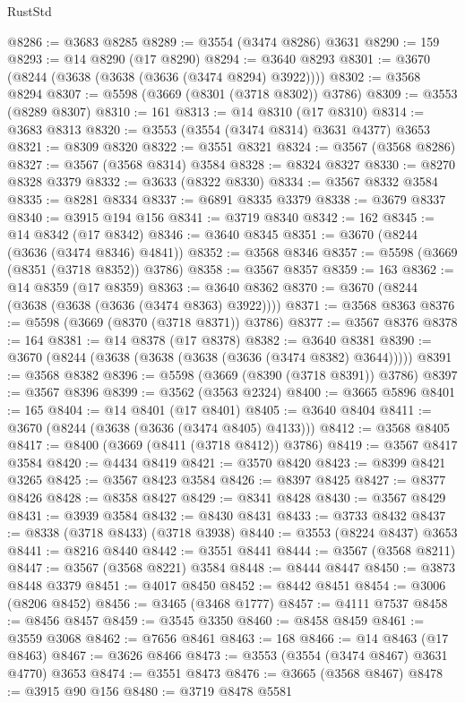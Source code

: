 \begin{lexlean}{RustStd}
\begin{coremodule}
@8286 := @3683 @8285
@8289 := @3554 (@3474 @8286) @3631
@8290 := 159
@8293 := @14 @8290 (@17 @8290)
@8294 := @3640 @8293
@8301 := @3670 (@8244 (@3638 (@3638 (@3636 (@3474 @8294) @3922))))
@8302 := @3568 @8294
@8307 := @5598 (@3669 (@8301 (@3718 @8302)) @3786)
@8309 := @3553 (@8289 @8307)
@8310 := 161
@8313 := @14 @8310 (@17 @8310)
@8314 := @3683 @8313
@8320 := @3553 (@3554 (@3474 @8314) @3631 @4377) @3653
@8321 := @8309 @8320
@8322 := @3551 @8321
@8324 := @3567 (@3568 @8286)
@8327 := @3567 (@3568 @8314) @3584
@8328 := @8324 @8327
@8330 := @8270 @8328 @3379
@8332 := @3633 (@8322 @8330)
@8334 := @3567 @8332 @3584
@8335 := @8281 @8334
@8337 := @6891 @8335 @3379
@8338 := @3679 @8337
@8340 := @3915 @194 @156
@8341 := @3719 @8340
@8342 := 162
@8345 := @14 @8342 (@17 @8342)
@8346 := @3640 @8345
@8351 := @3670 (@8244 (@3636 (@3474 @8346) @4841))
@8352 := @3568 @8346
@8357 := @5598 (@3669 (@8351 (@3718 @8352)) @3786)
@8358 := @3567 @8357
@8359 := 163
@8362 := @14 @8359 (@17 @8359)
@8363 := @3640 @8362
@8370 := @3670 (@8244 (@3638 (@3638 (@3636 (@3474 @8363) @3922))))
@8371 := @3568 @8363
@8376 := @5598 (@3669 (@8370 (@3718 @8371)) @3786)
@8377 := @3567 @8376
@8378 := 164
@8381 := @14 @8378 (@17 @8378)
@8382 := @3640 @8381
@8390 := @3670 (@8244 (@3638 (@3638 (@3638 (@3636 (@3474 @8382) @3644)))))
@8391 := @3568 @8382
@8396 := @5598 (@3669 (@8390 (@3718 @8391)) @3786)
@8397 := @3567 @8396
@8399 := @3562 (@3563 @2324)
@8400 := @3665 @5896
@8401 := 165
@8404 := @14 @8401 (@17 @8401)
@8405 := @3640 @8404
@8411 := @3670 (@8244 (@3638 (@3636 (@3474 @8405) @4133)))
@8412 := @3568 @8405
@8417 := @8400 (@3669 (@8411 (@3718 @8412)) @3786)
@8419 := @3567 @8417 @3584
@8420 := @4434 @8419
@8421 := @3570 @8420
@8423 := @8399 @8421 @3265
@8425 := @3567 @8423 @3584
@8426 := @8397 @8425
@8427 := @8377 @8426
@8428 := @8358 @8427
@8429 := @8341 @8428
@8430 := @3567 @8429
@8431 := @3939 @3584
@8432 := @8430 @8431
@8433 := @3733 @8432
@8437 := @8338 (@3718 @8433) (@3718 @3938)
@8440 := @3553 (@8224 @8437) @3653
@8441 := @8216 @8440
@8442 := @3551 @8441
@8444 := @3567 (@3568 @8211)
@8447 := @3567 (@3568 @8221) @3584
@8448 := @8444 @8447
@8450 := @3873 @8448 @3379
@8451 := @4017 @8450
@8452 := @8442 @8451
@8454 := @3006 (@8206 @8452)
@8456 := @3465 (@3468 @1777)
@8457 := @4111 @7537
@8458 := @8456 @8457
@8459 := @3545 @3350
@8460 := @8458 @8459
@8461 := @3559 @3068
@8462 := @7656 @8461
@8463 := 168
@8466 := @14 @8463 (@17 @8463)
@8467 := @3626 @8466
@8473 := @3553 (@3554 (@3474 @8467) @3631 @4770) @3653
@8474 := @3551 @8473
@8476 := @3665 (@3568 @8467)
@8478 := @3915 @90 @156
@8480 := @3719 @8478 @5581

\end{coremodule}
\end{lexlean}
